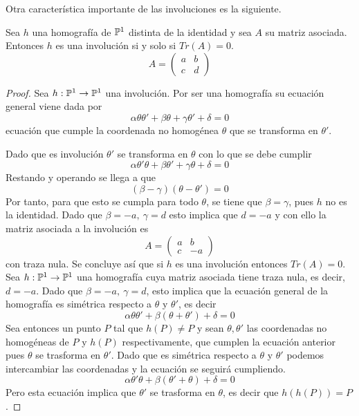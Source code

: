 Otra característica importante de las involuciones es la siguiente.
\begin{lem}
	Sea $h$ una homografía de $\mathbb{P}^1$ distinta de la identidad y sea $A$ su matriz asociada. Entonces $h$ es una involución si y solo si $Tr(A)=0$.
	\begin{equation*}
		A=\left( \begin{array}{cc}
			a&b\\
			c&d
		\end{array}\right)
	\end{equation*}
\end{lem}
\begin{proof}
	\bra \quad  Sea $h:\mathbb{P}^1\rightarrow\mathbb{P}^1$ una involución. Por ser una homografía su ecuación general viene dada por  
	\begin{equation*}
		\alpha\theta\theta'+\beta\theta+\gamma\theta'+\delta=0
	\end{equation*}
	ecuación que cumple la coordenada no homogénea $\theta$ que se transforma en $\theta'$.
	
	Dado que es involución $\theta'$ se transforma en $\theta$ con lo que se debe cumplir
	\begin{equation*}
		\alpha\theta'\theta+\beta\theta'+\gamma\theta+\delta=0
	\end{equation*}
	Restando y operando se llega a que 
	\begin{equation*}
		(\beta-\gamma)(\theta-\theta')=0
	\end{equation*}
	Por tanto, para que esto se cumpla para todo $\theta$, se tiene que $\beta=\gamma$, pues $h$ no es la identidad. Dado que $\beta=-a, \ \gamma=d$ esto implica que $d=-a$ y con ello la matriz asociada a la involución es
	\begin{equation*}
		A=\left( \begin{array}{cc}
			a&b\\
			c&-a
		\end{array}\right)
	\end{equation*}
	con traza nula. Se concluye así que si $h$ es una involución entonces $Tr(A)=0$.\\
	
	\bla \quad Sea $h:\mathbb{P}^1\rightarrow\mathbb{P}^1$ una homografía cuya matriz asociada tiene traza nula, es decir, $d=-a$. Dado que $\beta=-a, \ \gamma=d$, esto implica que la ecuación general de la homografía es simétrica respecto a $\theta$ y $\theta'$, es decir
	\begin{equation*}
		\alpha\theta\theta'+\beta(\theta+\theta')+\delta=0
	\end{equation*}
	Sea entonces un punto $P$ tal que $h(P)\not=P$ y sean $\theta,\theta'$ las coordenadas no homogéneas de $P$ y $h(P)$ respectivamente, que cumplen la ecuación anterior pues $\theta$ se trasforma en $\theta'$.  Dado que es simétrica respecto a $\theta$ y $\theta'$ podemos intercambiar las coordenadas y la ecuación se seguirá cumpliendo.
	\begin{equation*}
		\alpha\theta'\theta+\beta(\theta'+\theta)+\delta=0
	\end{equation*}
	Pero esta ecuación implica que $\theta'$ se trasforma en $\theta$, es decir que $h(h(P))=P$. 
	

\end{proof}
